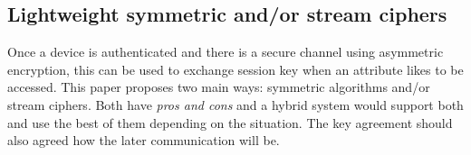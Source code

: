 \documentclass[10pt,a4paper,twoside]{llncs}
\newcommand{\todo}[1]{\texttt{\color{red}TODO:} ``\emph{#1}''}
\newcommand{\tango}{\textsc{Tango}}
\begin{document}


\subsection{Lightweight symmetric and/or stream ciphers}

Once a device is authenticated and there is a secure channel using asymmetric encryption, this can be used to exchange session key when an attribute likes to be accessed. This paper proposes two main ways: symmetric algorithms and/or stream ciphers. Both have \emph{pros and cons} and a hybrid system would support both and use the best of them depending on the situation. The key agreement should also agreed how the later communication will be.
\end{document}
